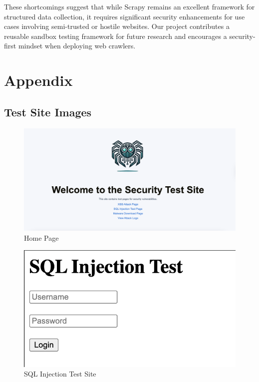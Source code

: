 These shortcomings suggest that while Scrapy remains an excellent framework for structured data collection, it requires significant security enhancements for use cases involving semi-trusted or hostile websites.  Our project contributes a reusable sandbox testing framework for future research and encourages a security-first mindset when deploying web crawlers.

\section{Appendix}
\subsection{Test Site Images}
\begin{figure}[!t]
    \centering
    \includegraphics[width=\textwidth]{figures/home.png}
    \caption{Home Page}
    \label{fig:architecture}
    \end{figure}
    
    \begin{figure}[!t]
    \centering
    \includegraphics[width=\textwidth]{figures/sqltest.png}
    \caption{SQL Injection Test Site}
    \label{fig:architecture}
    \end{figure}
    
